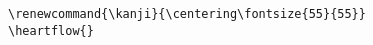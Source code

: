 \documentclass[letterpaper]{article}
\begin{document}
\begin{multicols}{4}
	\RLmulticolcolumns
	
	\columnbreak
		
	\columnbreak

	\columnbreak
	

\end{multicols}

\begin{verbatim}
\renewcommand{\kanji}{\centering\fontsize{55}{55}}
\heartflow{}
\end{verbatim}

\vfill\eject\pagebreak

\vspace*{2cm}
\renewcommand{\kanji}{\centering\fontsize{40}{40}}
\textcolor{gray}{\kanji{四弘誓願}}
\vspace*{2cm}

\renewcommand{\kanji}{\centering\fontsize{35}{35}}
\begin{multicols}{7}
	
	\RLmulticolcolumns
    \coda
	\coda
	\coda
\end{multicols}	
\end{document}
